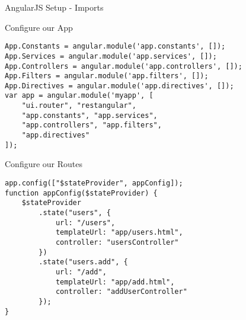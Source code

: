 \documentclass[presentation]{beamer}
\begin{document}
\begin{frame}[fragile,label=sec-2-1]{AngularJS Setup - Imports}
\begin{frame}[fragile,label=sec-2-5]{Configure our App}
\begin{verbatim}
App.Constants = angular.module('app.constants', []);
App.Services = angular.module('app.services', []);
App.Controllers = angular.module('app.controllers', []);
App.Filters = angular.module('app.filters', []);
App.Directives = angular.module('app.directives', []);
var app = angular.module('myapp', [
    "ui.router", "restangular",
    "app.constants", "app.services",
    "app.controllers", "app.filters",
    "app.directives"
]);
\end{verbatim}
\end{frame}

\begin{frame}[fragile,label=sec-2-6]{Configure our Routes}
 \begin{verbatim}
app.config(["$stateProvider", appConfig]);
function appConfig($stateProvider) {
    $stateProvider
        .state("users", {
            url: "/users",
            templateUrl: "app/users.html",
            controller: "usersController"
        })
        .state("users.add", {
            url: "/add",
            templateUrl: "app/add.html",
            controller: "addUserController"
        });
}
\end{verbatim}
\end{frame}
\end{frame}
\end{document}
